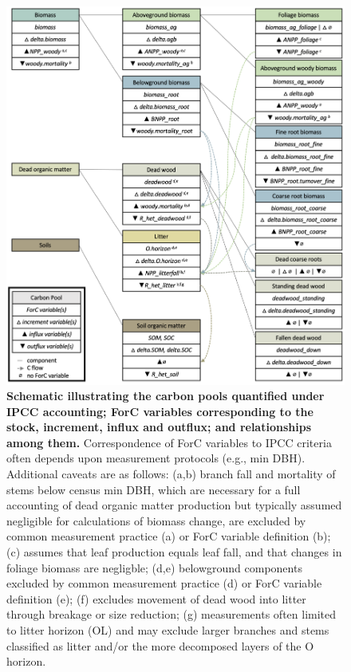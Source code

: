 \documentclass[, manuscript]{copernicus}
\begin{document}
\begin{figure}
\includegraphics[width=14cm]{figures_tables/C_variable_mapping} \caption{\textbf{Schematic illustrating the carbon pools quantified under IPCC accounting; ForC variables corresponding to the stock, increment, influx and outflux; and relationships among them.} Correspondence of ForC variables to IPCC criteria often depends upon measurement protocols (e.g., min DBH). Additional caveats are as follows: (a,b) branch fall and mortality of stems below census min DBH, which are necessary for a full accounting of dead organic matter production but typically assumed negligible for calculations of biomass change, are excluded by common measurement practice (a) or ForC variable definition (b); (c) assumes that leaf production equals leaf fall, and that changes in foliage biomass are negligble; (d,e) belowground components excluded by common measurement practice (d) or ForC variable definition (e); (f) excludes movement of dead wood into litter through breakage or size reduction; (g) measurements often limited to litter horizon (OL) and may exclude larger branches and stems classified as litter and/or the more decomposed layers of the O horizon.}\label{fig:fig_variable_mapping}
\end{figure}
\end{document}
